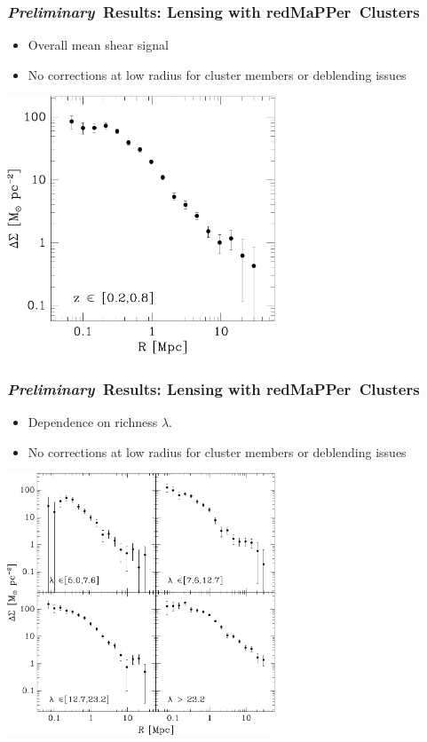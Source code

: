 \documentclass{beamer}
\newcommand{\redmapper}{redMaPPer}
\newcommand{\prelim}{{\bf{\it Preliminary}}}
\begin{document}
\frame
{
    \frametitle{\prelim\ Results: Lensing with \redmapper\ Clusters}

    \begin{itemize}

        \item Overall mean shear signal

        \item No corrections at low radius for cluster members or deblending issues

    \end{itemize}


    \begin{center}
        \includegraphics[width=0.6\textwidth]{run-rm008-bin-zwide-jack.pdf}
    \end{center}

}

\frame
{
    \frametitle{\prelim\ Results: Lensing with \redmapper\ Clusters}

    \begin{itemize}

        \item Dependence on richness $\lambda$.

        \item No corrections at low radius for cluster members or deblending issues

    \end{itemize}


    \begin{center}
        \includegraphics[width=0.6\textwidth]{run-rm008-bin-lbin4-zwide-jack.pdf}
    \end{center}

}
\end{document}
